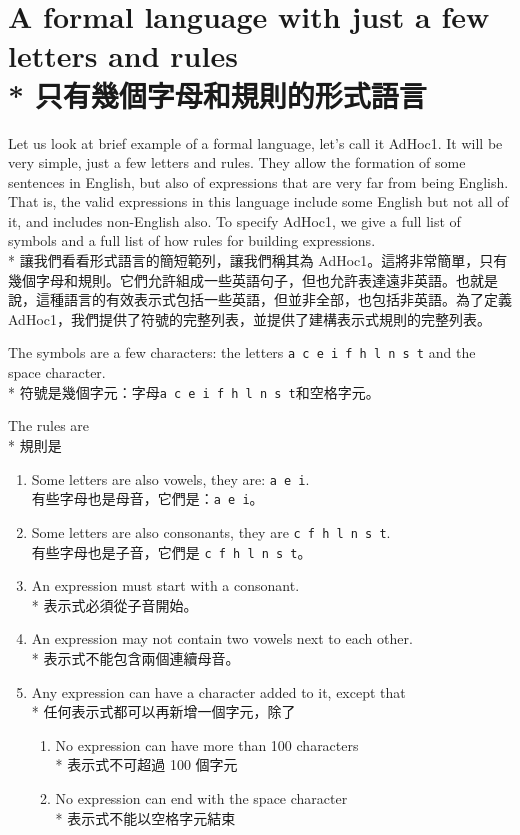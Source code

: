 \documentclass[]{article}
\begin{document}
\section*{{\color{gray}A formal language with just a few letters and rules}
\\*
{只有幾個字母和規則的形式語言}}

{\color{gray}Let us look at brief example of a formal language, let's call it AdHoc1. It will be very simple, just a few letters and rules. They allow the formation of some sentences in English, but also of expressions that are very far from being English. That is, the valid expressions in this language include some English but not all of it, and includes non-English also. To specify AdHoc1, we give a full list of symbols and a full list of how rules for building expressions.}
\\*
{讓我們看看形式語言的簡短範列，讓我們稱其為 AdHoc1。這將非常簡單，只有幾個字母和規則。它們允許組成一些英語句子，但也允許表達遠非英語。也就是說，這種語言的有效表示式包括一些英語，但並非全部，也包括非英語。為了定義 AdHoc1，我們提供了符號的完整列表，並提供了建構表示式規則的完整列表。}

{\color{gray}The symbols are a few characters: the letters {\tt a c e i f h l n s t} and the space character.}
\\*
{符號是幾個字元：字母{\tt a c e i f h l n s t}和空格字元。}

{\color{gray}The rules are}
\\*
{規則是}
\begin{enumerate}
	\item {\color{gray}Some letters are also vowels, they are: {\tt a e i}.}
	\\
	{有些字母也是母音，它們是：{\tt a e i}。}
	\item {\color{gray}Some letters are also consonants, they are {\tt c f h l n s t}.}
	\\
	{有些字母也是子音，它們是 {\tt c f h l n s t}。}
	\item {\color{gray}An expression must start with a consonant.}
	\\*
	{表示式必須從子音開始。}
	\item {\color{gray}An expression may not contain two vowels next to each other.}
	\\*
	{表示式不能包含兩個連續母音。}
	\item {\color{gray}Any expression can have a character added to it, except that}
	\\*
	{任何表示式都可以再新增一個字元，除了}
		\begin{enumerate}
			\item {\color{gray}No expression can have more than 100 characters}
			\\*
			{表示式不可超過 100 個字元}
			\item {\color{gray}No expression can end with the space character}
			\\*
			{表示式不能以空格字元結束}
		\end{enumerate}
\end{enumerate}
\end{document}
